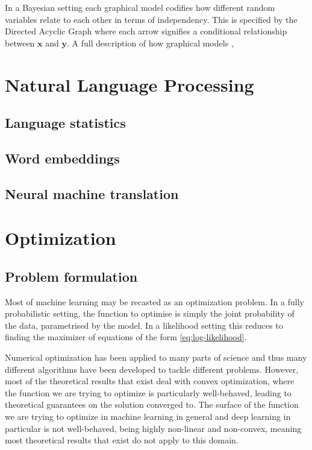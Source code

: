 In a Bayesian setting each graphical model codifies how different random variables relate
to each other in terms of independency. This is specified by the Directed
Acyclic Graph where each arrow signifies a conditional relationship between
$\bm{x}$ and $\bm{y}$. A full description of how graphical models ,

\section{Natural Language Processing}

\subsection{Language statistics}

\subsection{Word embeddings}

\subsection{Neural machine translation}

\section{Optimization}

\subsection{Problem formulation}

Most of machine learning may be recasted as an optimization problem. In a fully
probabilistic setting, the function to optimise is simply the joint probability
of the data, parametrised by the model. In a likelihood setting this reduces to
finding the maximizer of equations of the form \ref{eq:log-likelihood}.

Numerical optimization has been applied to many parts of science and thus many
different algorithms have been developed to tackle different problems. However,
most of the theoretical results that exist deal with convex optimization, where
the function we are trying to optimize is particularly well-behaved, leading to
theoretical guarantees on the solution converged to. The surface of the function
we are trying to optimize in machine learning in general and deep learning in
particular is not well-behaved, being highly non-linear and non-convex, meaning
most theoretical results that exist do not apply to this domain.

